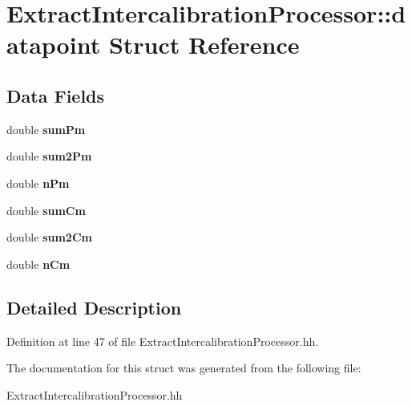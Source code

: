 \section{Extract\-Intercalibration\-Processor\-:\-:datapoint Struct Reference}
\label{structExtractIntercalibrationProcessor_1_1datapoint}
\subsection*{Data Fields}
\begin{DoxyCompactItemize}
\item 
double {\bfseries sum\-Pm}\label{structExtractIntercalibrationProcessor_1_1datapoint_a2296a48fc2edf2484cea3ff63798d776}

\item 
double {\bfseries sum2\-Pm}\label{structExtractIntercalibrationProcessor_1_1datapoint_aa1bf97ae54daebe458120feb1cd20e5b}

\item 
double {\bfseries n\-Pm}\label{structExtractIntercalibrationProcessor_1_1datapoint_a2cf8aea86179310ef849273ba9aa287c}

\item 
double {\bfseries sum\-Cm}\label{structExtractIntercalibrationProcessor_1_1datapoint_a582f77796997da2d1b842f200420a5a9}

\item 
double {\bfseries sum2\-Cm}\label{structExtractIntercalibrationProcessor_1_1datapoint_aa530064426d5ddd81d516645f1a1a5b6}

\item 
double {\bfseries n\-Cm}\label{structExtractIntercalibrationProcessor_1_1datapoint_a8426e7b551c47d25856217b8d0b45579}

\end{DoxyCompactItemize}


\subsection{Detailed Description}


Definition at line 47 of file Extract\-Intercalibration\-Processor.\-hh.



The documentation for this struct was generated from the following file\-:\begin{DoxyCompactItemize}
\item 
Extract\-Intercalibration\-Processor.\-hh\end{DoxyCompactItemize}
